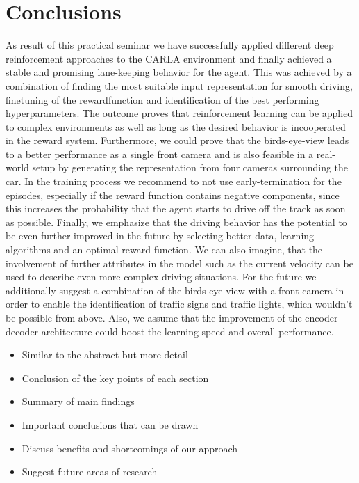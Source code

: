 \documentclass[letterpaper, 10 pt, conference]{ieeeconf}  %
\begin{document}
\section{Conclusions}
As result of this practical seminar we have successfully applied different deep reinforcement approaches to the CARLA environment and finally achieved a stable and promising lane-keeping behavior for the agent. This was achieved by a combination of finding the most suitable input representation for smooth driving, finetuning of the rewardfunction and identification of the best performing hyperparameters. The outcome proves that reinforcement learning can be applied to complex environments as well as long as the desired behavior is incooperated in the reward system. Furthermore, we could prove that the birds-eye-view leads to a better performance as a single front camera and is also feasible in a real-world setup by generating the representation from four cameras surrounding the car. In the training process we recommend to not use early-termination for the episodes, especially if the reward function contains negative components, since this increases the probability that the agent starts to drive off the track as soon as possible. Finally, we emphasize that the driving behavior has the potential to be even further improved in the future by selecting better data, learning algorithms and an optimal reward function. We can also imagine, that the involvement of further attributes in the model such as the current velocity can be used to describe even more complex driving situations.  \newline
For the future we additionally suggest a combination of the birds-eye-view with a front camera in order to enable the identification of traffic signs and traffic lights, which wouldn't be possible from above. Also, we assume that the improvement of the encoder-decoder architecture could boost the learning speed and overall performance.




\begin{itemize}
      \item Similar to the abstract but more detail
      \item Conclusion of the key points of each section
      \item Summary of main findings
      \item Important conclusions that can be drawn
      \item Discuss benefits and shortcomings of our approach
      \item Suggest future areas of research
   \end{itemize}
\end{document}
